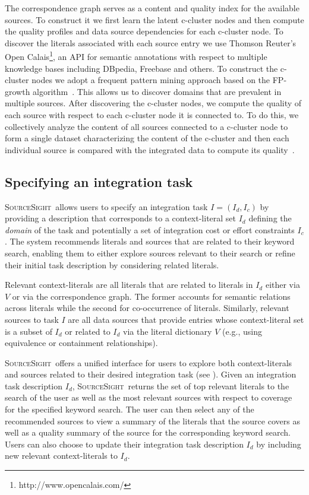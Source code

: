 \documentclass{vldb}
\newcommand\system{\textsc{SourceSight}}
\begin{document}
The correspondence graph serves as a content and quality index for the available sources. To construct it we first learn the latent c-cluster nodes and then compute the quality profiles and data source dependencies for each c-cluster node. To discover the literals associated with each source entry we use Thomson Reuter's Open Calais\footnote{http://www.opencalais.com/}, an API for semantic annotations with respect to multiple knowledge bases including DBpedia, Freebase and others. To construct the c-cluster nodes we adopt a frequent pattern mining approach based on the FP-growth algorithm~\cite{Han:2000}. This allows us to discover domains that are prevalent in multiple sources. After discovering the c-cluster nodes, we compute the quality of each source with respect to each c-cluster node it is connected to. To do this, we collectively analyze the content of all sources connected to a c-cluster node to form a single dataset characterizing the content of the c-cluster and then each individual source is compared with the integrated data to compute its quality~\cite{rekatsinas:2015}. 

\subsection{Specifying an integration task}
\label{sec:integtask}
\system~allows users to specify an integration task $I = (I_d, I_c)$ by providing a description that corresponds to a context-literal set $I_d$ defining the {\em domain} of the task and potentially a set of integration cost or effort constraints $I_c$. The system recommends literals and sources that are related to their keyword search, enabling them to either explore sources relevant to their search or refine their initial task description by considering related literals.

Relevant context-literals are all literals that are related to literals in $I_d$ either via $V$ or via the correspondence graph. The former accounts for semantic relations across literals while the second for co-occurrence of literals. Similarly, relevant sources to task $I$ are all data sources that provide entries whose context-literal set is a subset of $I_d$ or related to $I_d$ via the literal dictionary $V$ (e.g., using equivalence or containment relationships). 

\system~offers a unified interface for users to explore both context-literals and sources related to their desired integration task (see ). Given an integration task description $I_d$, \system~returns the set of top relevant literals to the search of the user as well as the most relevant sources with respect to coverage for the specified keyword search. The user can then select any of the recommended sources to view a summary of the literals that the source covers as well as a quality summary of the source for the corresponding keyword search. Users can also choose to update their integration task description $I_d$ by including new relevant context-literals to $I_d$.
\end{document}
